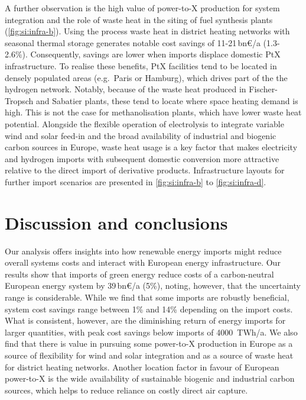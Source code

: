 \documentclass[5p,10pt]{elsarticle}
\newcommand{\bneuro}[1]{#1\,bn\euro{}/a}
\begin{document}

A further observation is the high value of power-to-X production for system
integration and the role of waste heat in the siting of fuel synthesis plants
(\cref{fig:si:infra-b}). Using the process waste heat in district heating
networks with seasonal thermal storage generates notable cost savings of
\bneuro{11-21} (1.3-2.6\%). Consequently, savings are lower when imports
displace domestic PtX infrastructure. To realise these benefits, PtX facilities
tend to be located in densely populated areas (e.g.~Paris or Hamburg), which
drives part of the the hydrogen network. Notably, because of the waste heat
produced in Fischer-Tropsch and Sabatier plants, these tend to locate where
space heating demand is high. This is not the case for methanolisation plants,
which have lower waste heat potential. Alongside the flexible operation of
electrolysis to integrate variable wind and solar feed-in and the broad
availability of industrial and biogenic carbon sources in Europe, waste heat
usage is a key factor that makes electricity and hydrogen imports with
subsequent domestic conversion more attractive relative to the direct import of
derivative products. Infrastructure layouts for further import scenarios are
presented in \cref{fig:si:infra-b} to \cref{fig:si:infra-d}.

\section*{Discussion and conclusions}
\label{sec:discussion}

Our analysis offers insights into how renewable energy imports might reduce
overall systems costs and interact with European energy infrastructure. Our
results show that imports of green energy reduce costs of a carbon-neutral
European energy system by \bneuro{39} (5\%), noting, however, that the
uncertainty range is considerable. While we find that some imports are robustly
beneficial, system cost savings range between 1\% and 14\% depending on the
import costs. What is consistent, however, are the diminishing return of energy
imports for larger quantities, with peak cost savings below imports of
4000~TWh/a. We also find that there is value in pursuing some \mbox{power-to-X}
production in Europe as a source of flexibility for wind and solar integration
and as a source of waste heat for district heating networks. Another location
factor in favour of European \mbox{power-to-X} is the  wide availability of
sustainable biogenic and industrial carbon sources, which helps to reduce
reliance on costly direct air capture.
\end{document}
